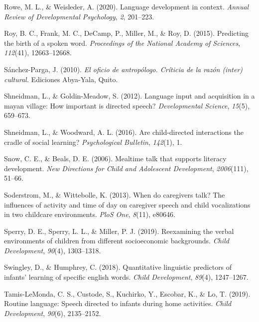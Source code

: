 \documentclass[
  man,floatsintext]{apa6}
\newlength{\cslhangindent}
\newlength{\cslentryspacingunit} %
\newenvironment{CSLReferences}[2] %
 {%
  \setlength{\parindent}{0pt}
  \ifodd #1
  \let\oldpar\par
  \def\par{\hangindent=\cslhangindent\oldpar}
  \fi
  \setlength{\parskip}{#2\cslentryspacingunit}
 }%
 {}
\begin{document}
\begin{CSLReferences}{1}{0}
\leavevmode{}%
Rowe, M. L., \& Weisleder, A. (2020). Language development in context. \emph{Annual Review of Developmental Psychology}, \emph{2}, 201--223.

\leavevmode{}%
Roy, B. C., Frank, M. C., DeCamp, P., Miller, M., \& Roy, D. (2015). Predicting the birth of a spoken word. \emph{Proceedings of the National Academy of Sciences}, \emph{112}(41), 12663--12668.

\leavevmode{}%
Sánchez-Parga, J. (2010). \emph{El oficio de antrop{ó}logo. Cr{í}ticia de la raz{ó}n (inter) cultural.} Ediciones Abya-Yala, Quito.

\leavevmode{}%
Shneidman, L., \& Goldin-Meadow, S. (2012). Language input and acquisition in a mayan village: How important is directed speech? \emph{Developmental Science}, \emph{15}(5), 659--673.

\leavevmode{}%
Shneidman, L., \& Woodward, A. L. (2016). Are child-directed interactions the cradle of social learning? \emph{Psychological Bulletin}, \emph{142}(1), 1.

\leavevmode{}%
Snow, C. E., \& Beals, D. E. (2006). Mealtime talk that supports literacy development. \emph{New Directions for Child and Adolescent Development}, \emph{2006}(111), 51--66.

\leavevmode{}%
Soderstrom, M., \& Wittebolle, K. (2013). When do caregivers talk? The influences of activity and time of day on caregiver speech and child vocalizations in two childcare environments. \emph{PloS One}, \emph{8}(11), e80646.

\leavevmode{}%
Sperry, D. E., Sperry, L. L., \& Miller, P. J. (2019). Reexamining the verbal environments of children from different socioeconomic backgrounds. \emph{Child Development}, \emph{90}(4), 1303--1318.

\leavevmode{}%
Swingley, D., \& Humphrey, C. (2018). Quantitative linguistic predictors of infants' learning of specific english words. \emph{Child Development}, \emph{89}(4), 1247--1267.

\leavevmode{}%
Tamis-LeMonda, C. S., Custode, S., Kuchirko, Y., Escobar, K., \& Lo, T. (2019). Routine language: Speech directed to infants during home activities. \emph{Child Development}, \emph{90}(6), 2135--2152.


\end{CSLReferences}
\end{document}
